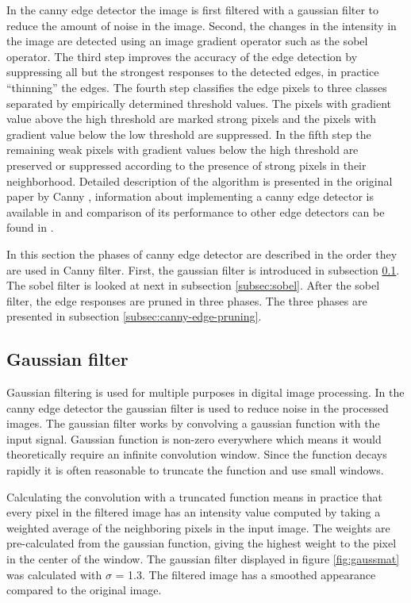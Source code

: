 In the canny edge detector the image is first filtered with a gaussian filter to reduce the amount of noise in the image. Second, the changes in the intensity in the image are detected using an image gradient operator such as the sobel operator. The third step improves the accuracy of the edge detection by suppressing all but the strongest responses to the detected edges, in practice ``thinning'' the edges. The fourth step classifies the edge pixels to three classes separated by empirically determined threshold values. The pixels with gradient value above the high threshold are marked strong pixels and the pixels with gradient value below the low threshold are suppressed. In the fifth step the remaining weak pixels with gradient values below the high threshold are preserved or suppressed according to the presence of strong pixels in their neighborhood. Detailed description of the algorithm is presented in the original paper by Canny \cite{canny1986computational}, information about implementing a canny edge detector is available in \cite{gonzalez2008digital} and comparison of its performance to other edge detectors can be found in \cite{maini2009study}.

In this section the phases of canny edge detector are described in the order they are used in Canny filter. First, the gaussian filter is introduced in subsection \ref{subsec:gauss}. The sobel filter is looked at next in subsection \ref{subsec:sobel}. After the sobel filter, the edge responses are pruned in three phases. The three phases are presented in subsection \ref{subsec:canny-edge-pruning}.

\subsection{Gaussian filter}
\label{subsec:gauss}
Gaussian filtering is used for multiple purposes in digital image processing. In the canny edge detector the gaussian filter is used to reduce noise in the processed images. The gaussian filter works by convolving a gaussian function with the input signal. Gaussian function is non-zero everywhere which means it would theoretically require an infinite convolution window. Since the function decays rapidly it is often reasonable to truncate the function and use small windows.~\cite{gonzalez2008digital} 

Calculating the convolution with a truncated function means in practice that every pixel in the filtered image has an intensity value computed by taking a weighted average of the neighboring pixels in the input image. The weights are pre-calculated from the gaussian function, giving the highest weight to the pixel in the center of the window. The gaussian filter displayed in figure \ref{fig:gaussmat} was calculated with $\sigma$ = 1.3. The filtered image has a smoothed appearance compared to the original image.

